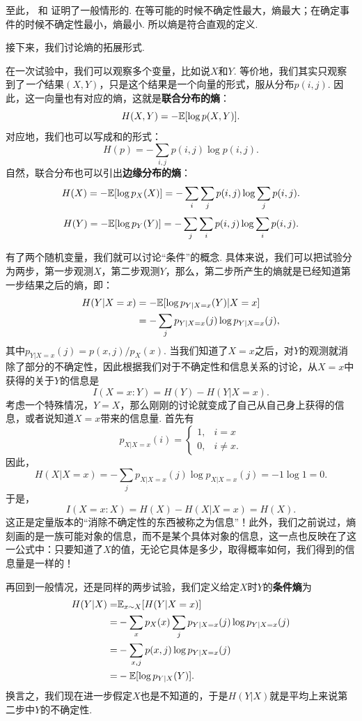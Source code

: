 至此， 和 证明了一般情形的. 在等可能的时候不确定性最大，熵最大；在确定事件的时候不确定性最小，熵最小. 所以熵是符合直观的定义. 

接下来，我们讨论熵的拓展形式.

在一次试验中，我们可以观察多个变量，比如说$X$和$Y$. 等价地，我们其实只观察到了\textit{一个}结果$(X,Y)$，只是这个结果是一个向量的形式，服从分布$p(i,j)$. 因此，这一向量也有对应的熵，这就是\textbf{联合分布的熵}：
    \[H(X,Y)=-\mathbb{E}[\log p(X,Y)].\]
对应地，我们也可以写成和的形式：
    \[H(p)=-\sum_{i,j}p(i,j)\log p(i,j).\]
自然，联合分布也可以引出\textbf{边缘分布的熵}：
\[H(X)=-\mathbb{E}[\log p_X(X)]=-\sum_i \sum_j p(i,j)\log \sum_j p(i,j).\]
\[H(Y)=-\mathbb{E}[\log p_Y(Y)]=-\sum_j \sum_i p(i,j)\log \sum_i p(i,j).\]

有了两个随机变量，我们就可以讨论“条件”的概念. 具体来说，我们可以把试验分为两步，第一步观测$X$，第二步观测$Y$，那么，第二步所产生的熵就是已经知道第一步结果之后的熵，即：
\begin{align*}
    H(Y| X=x)&=-\mathbb{E}[\log p_{Y| X=x}(Y)| X=x]\\
    &=-\sum_{j}p_{Y|X=x}(j)\log p_{Y|X=x}(j),
\end{align*}
其中$p_{Y|X=x}(j)=p(x,j)/p_X(x)$. 当我们知道了$X=x$之后，对$Y$的观测就消除了部分的不确定性，因此根据我们对于不确定性和信息关系的讨论，从$X=x$中获得的关于$Y$的信息是
\[I(X=x:Y)=H(Y)-H(Y|X=x).\]
考虑一个特殊情况，$Y=X$，那么刚刚的讨论就变成了自己从自己身上获得的信息，或者说知道$X=x$带来的信息量. 首先有
\[p_{X|X=x}(i)=\begin{cases}
    1,&i=x\\
    0,&i\ne x.
\end{cases}\]
因此，
\[H(X| X=x)=-\sum_{j}p_{X|X=x}(j)\log p_{X|X=x}(j)=-1\log 1=0.\]
于是，
\[I(X=x:X)=H(X)-H(X|X=x)=H(X).\]
这正是定量版本的“消除不确定性的东西被称之为信息”！此外，我们之前说过，熵刻画的是一族可能对象的信息，而不是某个具体对象的信息，这一点也反映在了这一公式中：只要知道了$X$的值，无论它具体是多少，取得概率如何，我们得到的信息量是一样的！

再回到一般情况，还是同样的两步试验，我们定义给定$X$时$Y$的\textbf{条件熵}为
\begin{align*}
    H(Y| X)=&\mathbb{E}_{x\sim X}[H(Y|X=x)]\\
    =&-\sum_x p_{X}(x)\sum_{j}p_{Y|X=x}(j)\log p_{Y|X=x}(j)\\
    =&-\sum_{x,j}p(x,j)\log p_{Y|X=x}(j)\\
    =&-\mathbb{E}[\log p_{Y| X}(Y)].
\end{align*}
换言之，我们现在进一步假定$X$也是不知道的，于是$H(Y|X)$就是平均上来说第二步中$Y$的不确定性. 

